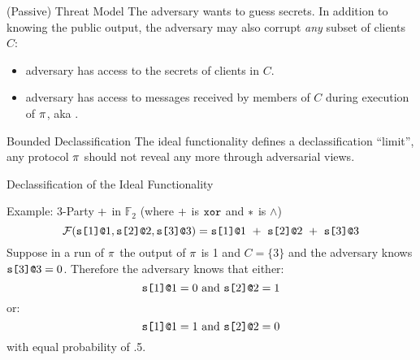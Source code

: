 \documentclass{beamer}
\begin{document}
\begin{frame}{(Passive) Threat Model}
  The adversary wants to guess secrets. In addition to knowing the public
  output, the adversary may also corrupt \emph{any} subset of clients $C$:
  \begin{itemize}
  \item adversary has access to the secrets of clients in $C$.
  \item adversary has access to messages received by members of $C$ during execution of $\pi$,
    aka .
  \end{itemize}

  \begin{alertblock}{Bounded Declassification}
    The ideal functionality defines a declassification ``limit'', any protocol $\pi$
    should not reveal any more through adversarial views.
  \end{alertblock}
\end{frame}

\begin{frame}{Declassification of the Ideal Functionality}

  \begin{exampleblock}{Example: 3-Party $+$ in $\mathbb{F}_2$ (where $+$ is $\texttt{xor}$ and $*$ is $\wedge$)}
  $$
  \mathcal{F}(\texttt{s[}1\texttt{]}\texttt{@}1,\texttt{s[}2\texttt{]}\texttt{@}2,\texttt{s[}3\texttt{]}\texttt{@}3) =
  \texttt{s[}1\texttt{]}\texttt{@}1\ +\ \texttt{s[}2\texttt{]}\texttt{@}2\ +\ \texttt{s[}3\texttt{]}\texttt{@}3
  $$
  Suppose in a run of $\pi$ the output of $\pi$ is 1 and $C = \{ 3 \}$ and
  the adversary knows $\texttt{s[}3\texttt{]}\texttt{@}3 = 0$.
  Therefore the adversary knows that either:
  $$
  \texttt{s[}1\texttt{]}\texttt{@}1 = 0 \text{\ and\ } \texttt{s[}2\texttt{]}\texttt{@}2 = 1
  $$
  or:
  $$
  \texttt{s[}1\texttt{]}\texttt{@}1 = 1 \text{\ and\ } \texttt{s[}2\texttt{]}\texttt{@}2 = 0
  $$
  with equal probability of .5. 
  \end{exampleblock}
  
\end{frame}
\end{document}
